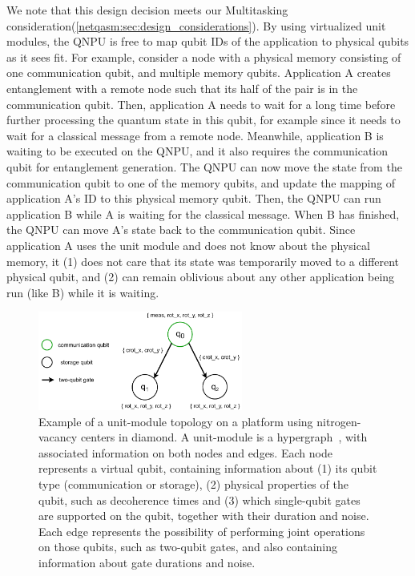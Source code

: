 We note that this design decision meets our Multitasking consideration(\cref{netqasm:sec:design_considerations}).
By using virtualized unit modules, the \ac{QNPU} is free to map qubit IDs of the application to physical qubits as it sees fit.
For example, consider a node with a physical memory consisting of one communication qubit, and multiple memory qubits.
Application A creates entanglement with a remote node such that its half of the pair is in the communication qubit.
Then, application A needs to wait for a long time before further processing the quantum state in this qubit, for example since it needs to wait for a classical message from a remote node.
Meanwhile, application B is waiting to be executed on the \ac{QNPU}, and it also requires the communication qubit for entanglement generation.
The \ac{QNPU} can now move the state from the communication qubit to one of the memory qubits, and update the mapping of application A's ID to this physical memory qubit.
Then, the \ac{QNPU} can run application B while A is waiting for the classical message.
When B has finished, the \ac{QNPU} can move A's state back to the communication qubit.
Since application A uses the unit module and does not know about the physical memory, it
    (1) does not care that its state was temporarily moved to a different physical qubit, and
    (2) can remain oblivious about any other application being run (like B) while it is waiting.


\begin{figure}[t]
      \centering
      \includegraphics[width=0.6\textwidth]{figures/netqasm/unit-module.pdf}
      \caption{Example of a unit-module topology on a platform using
            nitrogen-vacancy centers in diamond. A unit-module is a
            hypergraph~\cite{berge1984hypergraphs}, with associated information
            on both nodes and edges. Each node represents a virtual qubit,
            containing information about (1) its qubit type (communication or
            storage), (2) physical properties of the qubit, such as decoherence
            times and (3) which single-qubit gates are supported on the qubit,
            together with their duration and noise. Each edge represents the
            possibility of performing joint operations on those qubits, such as
            two-qubit gates, and also containing information about gate
            durations and noise.}
      \label{netqasm:fig:topology}
\end{figure}



